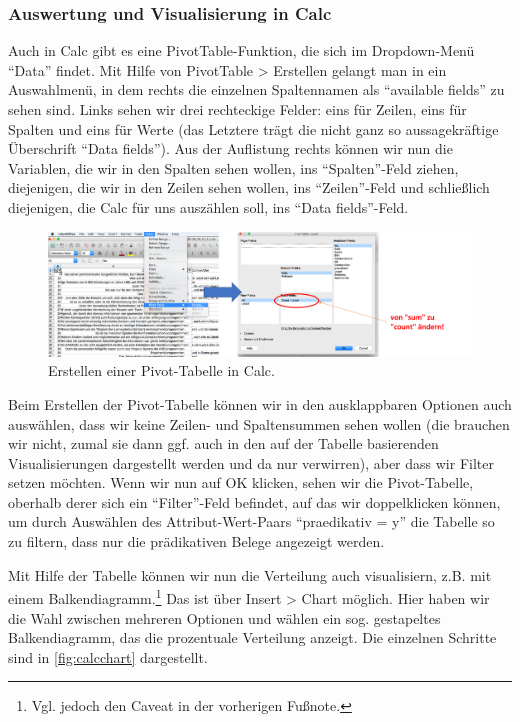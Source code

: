 \documentclass[]{article}
\let\rmarkdownfootnote\footnote%
\def\footnote{\protect\rmarkdownfootnote}
\begin{document}
\subsubsection{Auswertung und Visualisierung in
Calc}\label{auswertung-und-visualisierung-in-calc}

Auch in Calc gibt es eine PivotTable-Funktion, die sich im Dropdown-Menü
\enquote{Data} findet. Mit Hilfe von PivotTable \textgreater{} Erstellen
gelangt man in ein Auswahlmenü, in dem rechts die einzelnen Spaltennamen
als \enquote{available fields} zu sehen sind. Links sehen wir drei
rechteckige Felder: eins für Zeilen, eins für Spalten und eins für Werte
(das Letztere trägt die nicht ganz so aussagekräftige Überschrift
\enquote{Data fields}). Aus der Auflistung rechts können wir nun die
Variablen, die wir in den Spalten sehen wollen, ins
\enquote{Spalten}-Feld ziehen, diejenigen, die wir in den Zeilen sehen
wollen, ins \enquote{Zeilen}-Feld und schließlich diejenigen, die Calc
für uns auszählen soll, ins \enquote{Data fields}-Feld.

\begin{figure}
\includegraphics[width=6.66in]{docs/fig/calc_pivot} \caption{Erstellen einer Pivot-Tabelle in Calc.}\label{fig:calcpivot}
\end{figure}

Beim Erstellen der Pivot-Tabelle können wir in den ausklappbaren
Optionen auch auswählen, dass wir keine Zeilen- und Spaltensummen sehen
wollen (die brauchen wir nicht, zumal sie dann ggf. auch in den auf der
Tabelle basierenden Visualisierungen dargestellt werden und da nur
verwirren), aber dass wir Filter setzen möchten. Wenn wir nun auf OK
klicken, sehen wir die Pivot-Tabelle, oberhalb derer sich ein
\enquote{Filter}-Feld befindet, auf das wir doppelklicken können, um
durch Auswählen des Attribut-Wert-Paars \enquote{praedikativ = y} die
Tabelle so zu filtern, dass nur die prädikativen Belege angezeigt
werden.

Mit Hilfe der Tabelle können wir nun die Verteilung auch visualisiern,
z.B. mit einem Balkendiagramm.\footnote{Vgl. jedoch den Caveat in der
  vorherigen Fußnote.} Das ist über Insert \textgreater{} Chart möglich.
Hier haben wir die Wahl zwischen mehreren Optionen und wählen ein sog.
gestapeltes Balkendiagramm, das die prozentuale Verteilung anzeigt. Die
einzelnen Schritte sind in \ref{fig:calcchart} dargestellt.
\end{document}
